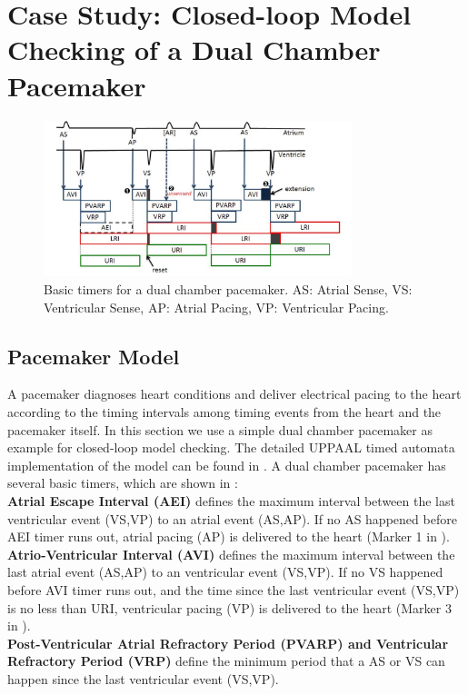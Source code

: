 \section{Case Study: Closed-loop Model Checking of a Dual Chamber Pacemaker}
\label{caseStudy}
\begin{figure}[!t]
	\centering
	\includegraphics[width=0.8\textwidth]{figs/PM_timers.pdf}
	\caption{\small Basic timers for a dual chamber pacemaker. AS: Atrial Sense, VS: Ventricular Sense, AP: Atrial Pacing, VP: Ventricular Pacing.}
	\label{fig:PM_timers}
\end{figure}

\subsection{Pacemaker Model}
A pacemaker diagnoses heart conditions and deliver electrical pacing to the heart according to the timing intervals among timing events from the heart and the pacemaker itself. In this section we use a simple dual chamber pacemaker as example for closed-loop model checking. The detailed UPPAAL timed automata implementation of the model can be found in \cite{sttt13}. A dual chamber pacemaker has several basic timers, which are shown in :\\
\textbf{Atrial Escape Interval (AEI)} defines the maximum interval between the last ventricular event (VS,VP) to an atrial event (AS,AP). If no AS happened before AEI timer runs out, atrial pacing (AP) is delivered to the heart (Marker 1 in ). \\
\textbf{Atrio-Ventricular Interval (AVI)} defines the maximum interval between the last atrial event (AS,AP) to an ventricular event (VS,VP). If no VS happened before AVI timer runs out, and the time since the last ventricular event (VS,VP) is no less than URI, ventricular pacing (VP) is delivered to the heart (Marker 3 in ).\\
\textbf{Post-Ventricular Atrial Refractory Period (PVARP) and Ventricular Refractory Period (VRP)} define the minimum period that a AS or VS can happen since the last ventricular event (VS,VP). 

